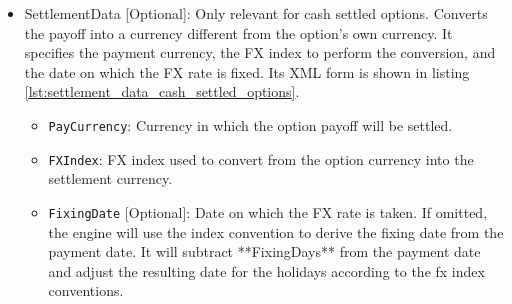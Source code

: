 \begin{itemize}
\begin{enumerate}
\item
The first method is an explicit list of dates as shown in Listing \ref{lst:dates_payment_data}. The \lstinline!Date! node should be a valid date as outlined in Table \ref{tab:allow_stand_data}. Obviously, for European options, there should be exactly one date supplied.

\item
The second method is a set of rules that are used to generate the settlement date relative to either the exercise date of the option or the expiry date of the option. The structure of the \lstinline!PaymentData! node in this case is given in Listing \ref{lst:rules_payment_data}. The optional \lstinline!RelativeTo! node must be either \lstinline!Expiry! or \lstinline!Exercise!. If it is \lstinline!Expiry!, the expiry date is taken as the base date from which the rules are applied. If it is \lstinline!Exercise!, the exercise date is taken as the base date from which the rules are applied. These two dates are the same in the case of a European option. If not provided, \lstinline!Expiry! is assumed. The \lstinline!Lag! node is a non-negative integer giving the number of days from the base date to the cash settlement date. The \lstinline!Calendar! gives the business day calendar for the cash settlement date and should be a valid calendar code as outlined in Table \ref{tab:calendar}. The \lstinline!Convention! gives the roll convention for the cash settlement date and should be a valid roll convention as outlined in Table \ref{tab:convention}.

\end{enumerate}

\item SettlementData [Optional]: Only relevant for cash settled options. Converts the payoff into a currency different from the option's own currency. It specifies the payment currency, the FX index to perform the conversion, and the date on which the FX rate is fixed. Its XML form is shown in listing \ref{lst:settlement_data_cash_settled_options}.

\begin{itemize}
  \item \lstinline!PayCurrency!: Currency in which the option payoff will be settled.
  \item \lstinline!FXIndex!: FX index used to convert from the option currency into the settlement currency.
  \item \lstinline!FixingDate! [Optional]: Date on which the FX rate is taken. If omitted, the engine will use the index convention to derive the fixing date from the payment date.
  It will subtract **FixingDays** from the payment date and adjust the resulting date for the holidays according to the fx index conventions.
\end{itemize}

\end{itemize}

